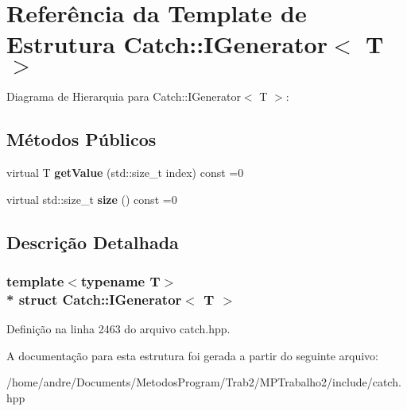 \hypertarget{structCatch_1_1IGenerator}{}\section{Referência da Template de Estrutura Catch\+:\+:I\+Generator$<$ T $>$}
\label{structCatch_1_1IGenerator}


Diagrama de Hierarquia para Catch\+:\+:I\+Generator$<$ T $>$\+:
\subsection*{Métodos Públicos}
\begin{DoxyCompactItemize}
\item 
virtual T {\bfseries get\+Value} (std\+::size\+\_\+t index) const =0\hypertarget{structCatch_1_1IGenerator_ad69e937cb66dba3ed9429c42abf4fce3}{}\label{structCatch_1_1IGenerator_ad69e937cb66dba3ed9429c42abf4fce3}

\item 
virtual std\+::size\+\_\+t {\bfseries size} () const =0\hypertarget{structCatch_1_1IGenerator_a2e317253b03e838b6065ce69719a198e}{}\label{structCatch_1_1IGenerator_a2e317253b03e838b6065ce69719a198e}

\end{DoxyCompactItemize}


\subsection{Descrição Detalhada}
\subsubsection*{template$<$typename T$>$\\*
struct Catch\+::\+I\+Generator$<$ T $>$}



Definição na linha 2463 do arquivo catch.\+hpp.



A documentação para esta estrutura foi gerada a partir do seguinte arquivo\+:\begin{DoxyCompactItemize}
\item 
/home/andre/\+Documents/\+Metodos\+Program/\+Trab2/\+M\+P\+Trabalho2/include/catch.\+hpp\end{DoxyCompactItemize}
